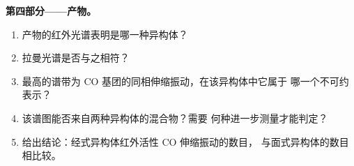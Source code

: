 \begin{problem}
\medskip\noindent\textbf{第四部分——产物。}
\begin{enumerate}[resume]
  \item 产物的红外光谱表明是哪一种异构体？
  \item 拉曼光谱是否与之相符？
  \item 最高的谱带为 CO 基团的同相伸缩振动，在该异构体中它属于
        哪一个不可约表示？
  \item 该谱图能否来自两种异构体的混合物？需要
        何种进一步测量才能判定？
  \item 给出结论：经式异构体红外活性 CO 伸缩振动的数目，
        与面式异构体的数目相比较。
\end{enumerate}
\end{problem}
